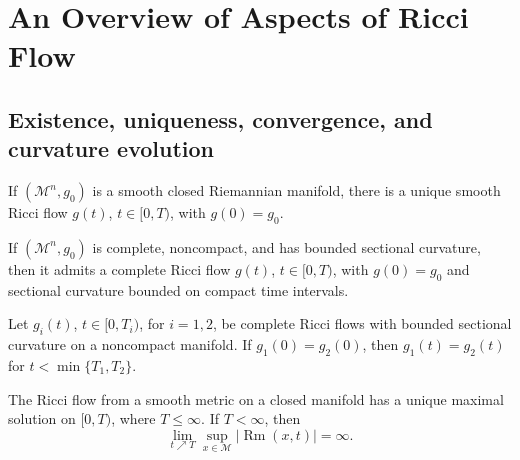 \chapter{An Overview of Aspects of Ricci Flow}
\label{app:chow-ii-overview-ricci-flow}

\section{Existence, uniqueness, convergence, and curvature evolution}

\begin{theorem}
\label{thm:chow-ii-appd-short-time-existence-closed}
If $(\mathcal M^n,g_0)$ is a smooth closed Riemannian manifold, there is a
unique smooth Ricci flow $g(t)$, $t\in[0,T)$, with $g(0)=g_0$.
\end{theorem}

\begin{theorem}
\label{thm:chow-ii-appd-short-time-existence-complete}
If $(\mathcal M^n,g_0)$ is complete, noncompact, and has bounded sectional
curvature, then it admits a complete Ricci flow $g(t)$, $t\in[0,T)$, with
$g(0)=g_0$ and sectional curvature bounded on compact time intervals.
\end{theorem}

\begin{theorem}
\label{thm:chow-ii-appd-uniqueness-complete}
Let $g_i(t)$, $t\in[0,T_i)$, for $i=1,2$, be complete Ricci flows with
bounded sectional curvature on a noncompact manifold. If $g_1(0)=g_2(0)$,
then $g_1(t)=g_2(t)$ for $t<\min\{T_1,T_2\}$.
\end{theorem}

\begin{theorem}
\label{thm:chow-ii-appd-long-time-existence-closed}
The Ricci flow from a smooth metric on a closed manifold has a unique maximal
solution on $[0,T)$, where $T\leq\infty$. If $T<\infty$, then
\[
 \lim_{t\nearrow T}\sup_{x\in\mathcal M}|\operatorname{Rm}(x,t)|=\infty.
\]
\end{theorem}

